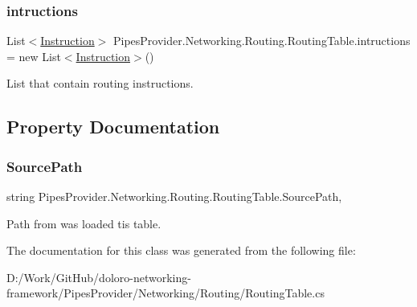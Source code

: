 \subsubsection{\texorpdfstring{intructions}{intructions}}
{\footnotesize\ttfamily List$<$\mbox{\hyperlink{class_pipes_provider_1_1_networking_1_1_routing_1_1_instruction}{Instruction}}$>$ Pipes\+Provider.\+Networking.\+Routing.\+Routing\+Table.\+intructions = new List$<$\mbox{\hyperlink{class_pipes_provider_1_1_networking_1_1_routing_1_1_instruction}{Instruction}}$>$()}



List that contain routing instructions. 



\subsection{Property Documentation}
\mbox{\label{class_pipes_provider_1_1_networking_1_1_routing_1_1_routing_table_af756c825762d5434f5b934a1c1b2d3eb}} 
\subsubsection{\texorpdfstring{Source\+Path}{SourcePath}}
{\footnotesize\ttfamily string Pipes\+Provider.\+Networking.\+Routing.\+Routing\+Table.\+Source\+Path\hspace{0.3cm}{\ttfamily [get]}, {\ttfamily [set]}}



Path from was loaded tis table. 



The documentation for this class was generated from the following file\+:\begin{DoxyCompactItemize}
\item 
D\+:/\+Work/\+Git\+Hub/doloro-\/networking-\/framework/\+Pipes\+Provider/\+Networking/\+Routing/Routing\+Table.\+cs\end{DoxyCompactItemize}
